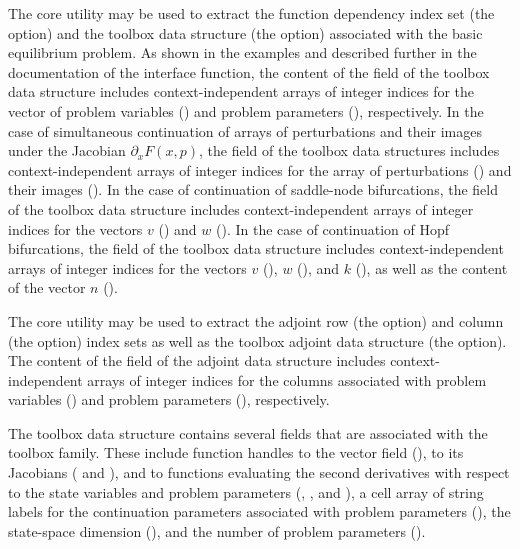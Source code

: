 The  core utility may be used to extract the function dependency index set (the  option) and the toolbox data structure (the  option) associated with the basic equilibrium problem. As shown in the examples and described further in the documentation of the  interface function, the content of the  field of the toolbox data structure includes context-independent arrays of integer indices for the vector of problem variables () and problem parameters (), respectively. In the case of simultaneous continuation of arrays of perturbations and their images under the Jacobian $\partial_x F(x,p)$, the  field of the toolbox data structures includes context-independent arrays of integer indices for the array of perturbations () and their images (). In the case of continuation of saddle-node bifurcations, the  field of the toolbox data structure includes context-independent arrays of integer indices for the vectors $v$ () and $w$ (). In the case of continuation of Hopf bifurcations, the  field of the toolbox data structure includes context-independent arrays of integer indices for the vectors $v$ (), $w$ (), and $k$ (), as well as the content of the vector $n$ ().

The  core utility may be used to extract the adjoint row (the  option) and column (the  option) index sets as well as the toolbox adjoint data structure (the  option). The content of the  field of the adjoint data structure includes context-independent arrays of integer indices for the columns associated with problem variables () and problem parameters (), respectively. 

The  toolbox data structure contains several fields that are associated with the  toolbox family. These include function handles to the vector field (), to its Jacobians ( and ), and to functions evaluating the second derivatives with respect to the state variables and problem parameters (, , and ), a cell array of string labels for the continuation parameters associated with problem parameters (), the state-space dimension (), and the number of problem parameters ().

